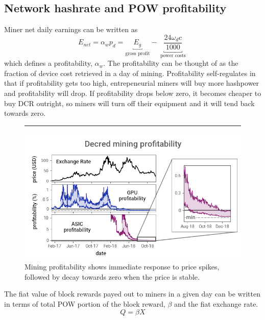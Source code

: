 \documentclass[a4paper,12pt]{article}
\begin{document}
% 


\begin{appendices}
\section{Network hashrate and POW profitability}



Miner net daily earnings can be written as 
%
\begin{equation}
\label{enet}
E_{net} = \alpha_w p_d = \underbracket{ E_g }_{\text{gross profit}} -  \underbracket{ \frac{ 24 \omega_d c }{ 1000 } }_{ \text{ power costs } } 
\end{equation}
%
which defines a profitability, $ \alpha_w $. The profitability can be thought of as the fraction of device cost retrieved in a day of mining. Profitability self-regulates in that if profitability gets too high, entrepeneurial miners will buy more hashpower and profitability will drop. If profitability drops below zero, it becomes cheaper to buy DCR outright, so miners will turn off their equipment and it will tend back towards zero. 


\begin{figure}[t!]
	\centering
	\vspace{-5pt}
	\hrule
	\vspace{5pt}
	\includegraphics[scale=1.60]{profitability}
	\caption{Mining profitability shows immediate response to price spikes, followed by decay towards zero when the price is stable. \label{profitabilityfig}}
	\vspace{5pt}
\end{figure}

The fiat value of block rewards payed out to miners in a given day can be written in terms of total POW portion of the block reward, $ \beta $ and the fiat exchange rate.
%
\begin{equation}
Q = \beta X
\end{equation}
%


\end{appendices}
\end{document}
